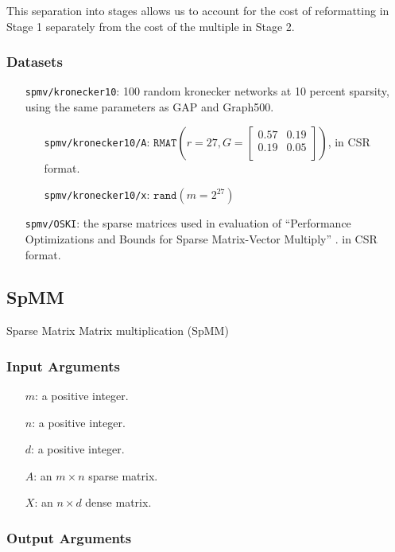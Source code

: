\documentclass{article}
\begin{document}
This separation into stages allows us to account for the cost of reformatting in Stage 1 separately from the cost of the multiple in Stage 2.

\subsubsection{Datasets}

\begin{itemize}
	\item[\texttt{spmv/kronecker10}:] 100 random kronecker networks at 10 percent sparsity, using the
	same parameters as GAP and Graph500\cite{noauthor_graph_nodate}.
	\begin{itemize}
		\item[\texttt{spmv/kronecker10/A}:] $ \texttt{RMAT}\left(r=27, G = \left[\begin{array}{cc}
			0.57 & 0.19 \\
			0.19 & 0.05 \\
		\end{array}\right]\right)$, in CSR format.
		\item[\texttt{spmv/kronecker10/x}:] $\texttt{rand}\left(m = 2^{27}\right)$
	\end{itemize}
	\item[\texttt{spmv/OSKI}:] the sparse matrices used in evaluation of
	``Performance Optimizations and Bounds for Sparse Matrix-Vector Multiply'' \cite{vuduc_performance_2002}. in CSR format.
\end{itemize}

\subsection{SpMM}
Sparse Matrix Matrix multiplication (SpMM)
\subsubsection{Input Arguments}

\begin{itemize}
	\item[$m$:] a positive integer.
	\item[$n$:] a positive integer.
	\item[$d$:] a positive integer.
	\item[$A$:] an $m \times n$ sparse matrix.
	\item[$X$:] an $n \times d$ dense matrix.
\end{itemize}

\subsubsection{Output Arguments}
\end{document}
